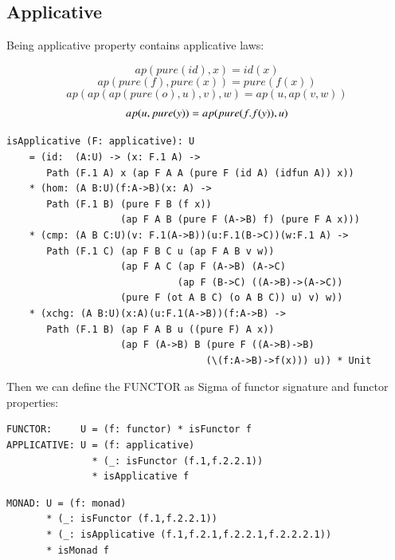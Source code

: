 \documentclass{article}
\begin{document}
\subsection*{Applicative}

Being applicative property contains applicative laws:

\begin{equation} ap(pure(id),x) = id(x) \end{equation}
\begin{equation} ap(pure(f),pure(x)) = pure(f(x)) \end{equation}
\begin{equation} ap(ap(ap(pure(o),u),v),w) = ap(u,ap(v,w)) \end{equation}
\begin{equation} ap(u,pure(y)) = ap(pure(\\f.f(y)),u) \end{equation}

\begin{lstlisting}[mathescape=true]
isApplicative (F: applicative): U
    = (id:  (A:U) -> (x: F.1 A) ->
       Path (F.1 A) x (ap F A A (pure F (id A) (idfun A)) x))
    * (hom: (A B:U)(f:A->B)(x: A) ->
       Path (F.1 B) (pure F B (f x))
                    (ap F A B (pure F (A->B) f) (pure F A x)))
    * (cmp: (A B C:U)(v: F.1(A->B))(u:F.1(B->C))(w:F.1 A) ->
       Path (F.1 C) (ap F B C u (ap F A B v w))
                    (ap F A C (ap F (A->B) (A->C)
                              (ap F (B->C) ((A->B)->(A->C))
                    (pure F (ot A B C) (o A B C)) u) v) w))
    * (xchg: (A B:U)(x:A)(u:F.1(A->B))(f:A->B) ->
       Path (F.1 B) (ap F A B u ((pure F) A x))
                    (ap F (A->B) B (pure F ((A->B)->B)
                                   (\(f:A->B)->f(x))) u)) * Unit
\end{lstlisting}

Then we can define the FUNCTOR as Sigma of functor signature and functor properties:

\begin{lstlisting}[mathescape=true]
FUNCTOR:     U = (f: functor) * isFunctor f
APPLICATIVE: U = (f: applicative)
               * (_: isFunctor (f.1,f.2.2.1))
               * isApplicative f
\end{lstlisting}
\begin{lstlisting}[mathescape=true]
MONAD: U = (f: monad)
       * (_: isFunctor (f.1,f.2.2.1))
       * (_: isApplicative (f.1,f.2.1,f.2.2.1,f.2.2.2.1))
       * isMonad f
\end{lstlisting}
\end{document}
